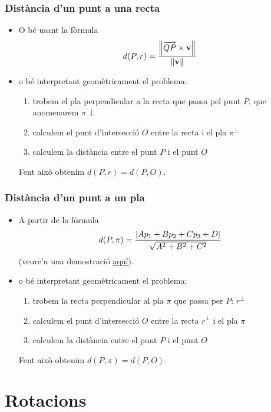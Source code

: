 \documentclass{beamer}
\begin{document}
\begin{frame}
\frametitle{Distància d'un punt a una recta}
\begin{itemize}
  \item O bé usant la fòrmula
  \[
    d(P,r)=\frac{\norm{\overrightarrow{QP}\times\textbf{v}}}{\norm{\textbf{v}}}
  \]
  \item o bé interpretant geomètricament el problema:
  \begin{enumerate}
    \item trobem el pla perpendicular a la recta que passa pel punt $P$, que anomenarem $\pi{\perp}$
    \item calculem el punt d'intersecció $O$ entre la recta i el pla $\pi^{\perp}$
    \item calculem la distància entre el punt $P$ i el punt $O$
  \end{enumerate}
  Fent això obtenim $d(P,r)=d(P,O)$.
\end{itemize}
\end{frame}
\begin{frame}
\frametitle{Distància d'un punt a un pla}
\begin{itemize}
  \item A partir de la fòrmula
  \[
    d(P,\pi)=\frac{\abs{Ap_1+Bp_2+Cp_3+D}}{\sqrt{A^2+B^2+C^2}}
  \]
  (veure'n una demostració \href{https://www.youtube.com/watch?v=mUi2o8MnkkU}{aquí}).
  \item o bé interpretant geomètricament el problema:
  \begin{enumerate}
    \item trobem la recta perpendicular al pla $\pi$ que passa per $P$: $r^{\perp}$
    \item calculem el punt d'intersecció $O$ entre la recta $r^{\perp}$ i el pla $\pi$
    \item calculem la distància entre el punt $P$ i el punt $O$
  \end{enumerate}
  Fent això obtenim $d(P,\pi)=d(P,O)$.
\end{itemize}
\end{frame}
\section{Rotacions}
\end{document}
